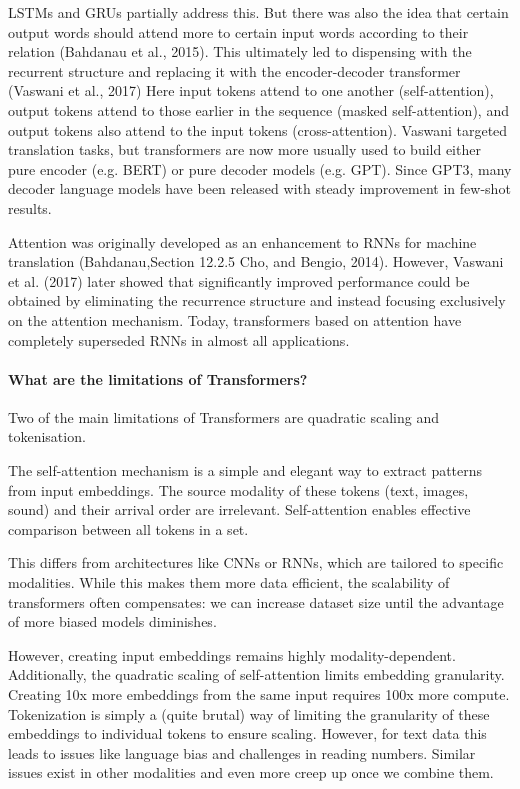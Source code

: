 LSTMs and GRUs partially address this.
But there was also the idea that certain
output words should attend more to certain input words according to their relation (Bahdanau
et al., 2015). This ultimately led to dispensing with the recurrent structure and replacing it with
the encoder-decoder transformer (Vaswani et al., 2017)
Here input tokens attend to one another
(self-attention), output tokens attend to those earlier in the sequence (masked self-attention),
and output tokens also attend to the input tokens (cross-attention). 
Vaswani targeted translation tasks, but transformers are now more usually used to build either pure encoder (e.g. BERT)
or pure decoder models (e.g. GPT).
Since GPT3, many decoder language models have been released with steady improvement in
few-shot results.

Attention was originally developed as an enhancement to RNNs for machine translation (Bahdanau,Section 12.2.5
Cho, and Bengio, 2014). However, Vaswani et al. (2017) later showed that significantly
improved performance could be obtained by eliminating the recurrence structure
and instead focusing exclusively on the attention mechanism. Today, transformers
based on attention have completely superseded RNNs in almost all applications.

\paragraph{What are the limitations of Transformers?}

Two of the main limitations of Transformers are quadratic scaling and tokenisation.

The self-attention mechanism is a simple and elegant way to extract patterns from input embeddings.
The source modality of these tokens (text, images, sound) and their arrival order are irrelevant.
Self-attention enables effective comparison between all tokens in a set.

This differs from architectures like CNNs or RNNs, which are tailored to specific modalities.
While this makes them more data efficient, the scalability of transformers often compensates:
we can increase dataset size until the advantage of more biased models diminishes.

However, creating input embeddings remains highly modality-dependent.
Additionally, the quadratic scaling of self-attention limits embedding granularity.
Creating 10x more embeddings from the same input requires 100x more compute.
Tokenization is simply a (quite brutal) way of limiting the granularity of these embeddings to individual tokens to ensure scaling.
However, for text data this leads to issues like language bias and challenges in reading numbers.
Similar issues exist in other modalities and even more creep up once we combine them.

